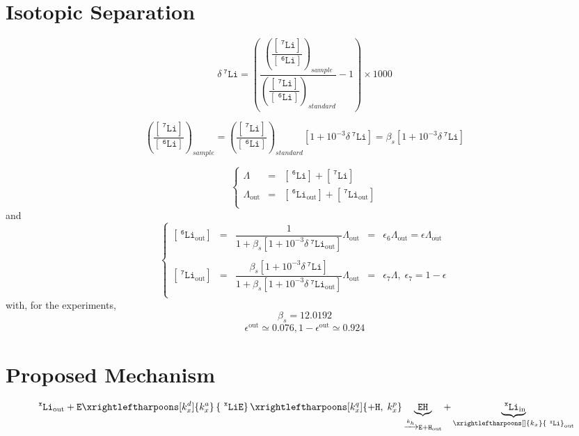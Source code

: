 \documentclass[aps,onecolumn,12pt]{revtex4}
\newcommand{\mychem}[1]{\mathtt{#1}}
\newcommand{\myconc}[1]{\left\lbrack{#1}\right\rbrack}
\newcommand{\spLi}[1]{{~^{\mychem{#1}}\mychem{Li}}}
\newcommand{\Li}[1]{\myconc{\spLi{#1}}}
\newcommand{\spEout}{\mychem{E}}
\newcommand{\spLiE}[1]{\left\lbrace\spLi{#1}\spEout\right\rbrace}
\newcommand{\spLiIn}[1]{{\spLi{#1}}_{\mathrm{in}}}
\newcommand{\spLiOut}[1]{{\spLi{#1}}_{\mathrm{out}}}
\newcommand{\LiOut}[1]{\myconc{\spLiOut{#1}}}
\newcommand{\spEHin}{\mychem{EH}}
\newcommand{\deltaLi}{ {\delta\!\!\!\spLi{7}} }
\newcommand{\deltaLiOut}{{\deltaLi}_{\mathrm{out}}}
\newcommand{\LiAll}{\Lambda}
\newcommand{\LiAllOut}{{\LiAll}_{\mathrm{out}}}
\begin{document}
\tableofcontents

\section{Isotopic Separation}
$$
	\deltaLi = \left(
		\dfrac{\left(\dfrac{\Li{7}}{\Li{6}}\right)_{sample}}
		{\left(\dfrac{\Li{7}}{\Li{6}}\right)_{standard}}
		 -1 
	\right) \times 1000
$$

$$
	\left(\dfrac{\Li{7}}{\Li{6}}\right)_{sample} = \left(\dfrac{\Li{7}}{\Li{6}}\right)_{standard} \left[1+10^{-3}\deltaLi\right] = \beta_s \left[1+10^{-3}\deltaLi\right]
$$

\begin{equation}
\left\lbrace
\begin{array}{rcl}
	\LiAll    & = & \Li{6} + \Li{7}\\
	\LiAllOut & = & \LiOut{6} + \LiOut{7}\\
\end{array}
\right.
\end{equation}
and
\begin{equation}
\left\lbrace
\begin{array}{rclcl}
	\LiOut{6} & = & \dfrac{1}{1+\beta_s \left[1+10^{-3}\deltaLiOut\right] } \LiAllOut & = & \epsilon_6 \LiAllOut  = \epsilon \LiAllOut \\
	\\
	\LiOut{7} & = & \dfrac{\beta_s \left[1+10^{-3}\deltaLi\right]}{1+\beta_s \left[1+10^{-3}\deltaLiOut\right] } \LiAllOut & = & \epsilon_7 \LiAll,\;\epsilon_7 = 1-\epsilon \\
\end{array}
\right.
\end{equation}
with, for the experiments,
\begin{equation}
	\beta_s = 12.0192
\end{equation}
\begin{equation}
	\epsilon^\mathrm{out} \simeq 0.076, 1-\epsilon^\mathrm{out} \simeq 0.924
\end{equation}

\section{Proposed Mechanism}

\begin{equation}
	 \spLiOut{x} +  \spEout  
	 \xrightleftharpoons[k_x^d]{k_x^a} 
	 \spLiE{x}
	  \xrightleftharpoons[k_x^q]{\mychem{+H},\;k_x^p} \underbrace{\spEHin}_{\xrightarrow[]{k_h} \mychem{E} + \mychem{H}_{\mathrm{out}}} + \underbrace{\spLiIn{x}}_{\xrightleftharpoons[]{k_x} \spLiOut{x}}
\end{equation}
\end{document}
